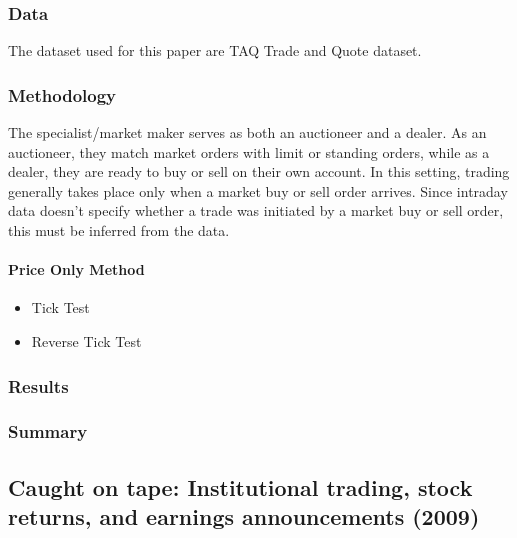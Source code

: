 \documentclass[10pt]{report}
\begin{document}
\subsubsection{Data}

The dataset used for this paper are TAQ Trade and Quote dataset. 



\subsubsection{Methodology}
The specialist/market maker serves as both an auctioneer and a dealer. As an auctioneer, they match market orders with limit or standing orders, while as a dealer, they are ready to buy or sell on their own account. In this setting, trading generally takes place only when a market buy or sell order arrives. Since intraday data doesn't specify whether a trade was initiated by a market buy or sell order, this must be inferred from the data.

\paragraph{Price Only Method}

\begin{itemize}
    \item Tick Test
    \item Reverse Tick Test
\end{itemize}


\subsubsection{Results}



\subsubsection{Summary}






















\subsection{Caught on tape: Institutional trading, stock returns,
and earnings announcements (2009)}
\end{document}
